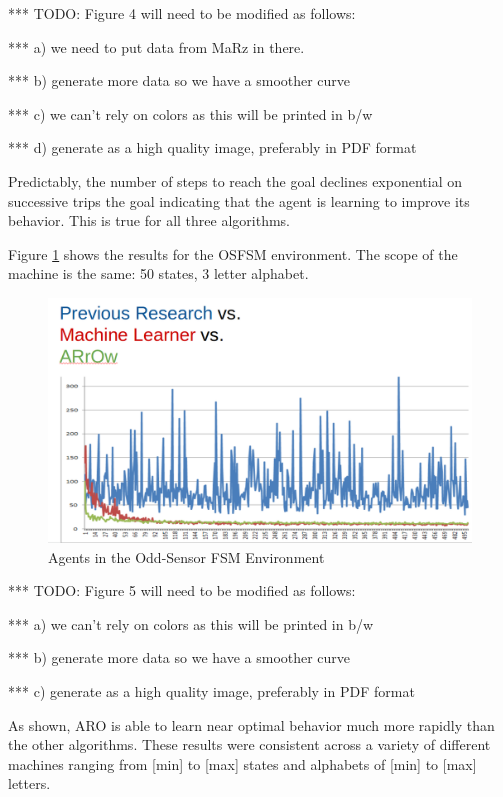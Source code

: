 \documentclass[letterpaper]{article} %
\begin{document}
*** TODO: Figure 4 will need to be modified as follows:

***    a) we need to put data from MaRz in there.

***    b) generate more data so we have a smoother curve

***    c) we can't rely on colors as this will be printed in b/w

***    d) generate as a high quality image, preferably in PDF format


Predictably, the number of steps to reach the goal declines
exponential on successive trips the goal indicating that the agent is
learning to improve its behavior.  This is true for all three
algorithms.

Figure \ref{fig5} shows the results for the OSFSM environment.  The scope of
the machine is the same: 50 states, 3 letter alphabet.  

\begin{figure}[t]
  \centering
  \includegraphics[width=0.9\columnwidth]{OSFSMResult.png} %
  \caption{Agents in the Odd-Sensor FSM Environment}
  \label{fig5}
\end{figure}

*** TODO: Figure 5 will need to be modified as follows:

***    a) we can't rely on colors as this will be printed in b/w

***    b) generate more data so we have a smoother curve

***    c) generate as a high quality image, preferably in PDF format


As shown, ARO is able to learn near optimal behavior much more rapidly
than the other algorithms.  These results were consistent across a
variety of different machines ranging from [min] to [max] states and
alphabets of [min] to [max] letters.
\end{document}
